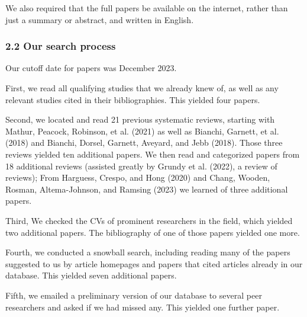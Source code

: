 \documentclass[
  man]{apa6}
\begin{document}
We also required that the full papers be available on the internet, rather than just a summary or abstract, and written in English.

\subsubsection{2.2 Our search process}\label{our-search-process}

Our cutoff date for papers was December 2023.

First, we read all qualifying studies that we already knew of, as well as any relevant studies cited in their bibliographies. This yielded four papers.

Second, we located and read 21 previous systematic reviews, starting with Mathur, Peacock, Robinson, et al. (2021) as well as Bianchi, Garnett, et al. (2018) and Bianchi, Dorsel, Garnett, Aveyard, and Jebb (2018). Those three reviews yielded ten additional papers. We then read and categorized papers from 18 additional reviews (assisted greatly by Grundy et al. (2022), a review of reviews); From Harguess, Crespo, and Hong (2020) and Chang, Wooden, Rosman, Altema-Johnson, and Ramsing (2023) we learned of three additional papers.

Third, We checked the CVs of prominent researchers in the field, which yielded two additional papers. The bibliography of one of those papers yielded one more.

Fourth, we conducted a snowball search, including reading many of the papers suggested to us by article homepages and papers that cited articles already in our database. This yielded seven additional papers.

Fifth, we emailed a preliminary version of our database to several peer researchers and asked if we had missed any. This yielded one further paper.
\end{document}
